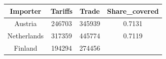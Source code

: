 \documentclass[10pt,]{article}
\begin{document}
\begin{longtable}[]{@{}cccc@{}}
\toprule
\begin{minipage}[b]{0.26\columnwidth}\centering\strut
Importer\strut
\end{minipage} & \begin{minipage}[b]{0.12\columnwidth}\centering\strut
Tariffs\strut
\end{minipage} & \begin{minipage}[b]{0.10\columnwidth}\centering\strut
Trade\strut
\end{minipage} & \begin{minipage}[b]{0.18\columnwidth}\centering\strut
Share\_covered\strut
\end{minipage}\tabularnewline
\midrule
\endhead
\begin{minipage}[t]{0.26\columnwidth}\centering\strut
Austria\strut
\end{minipage} & \begin{minipage}[t]{0.12\columnwidth}\centering\strut
246703\strut
\end{minipage} & \begin{minipage}[t]{0.10\columnwidth}\centering\strut
345939\strut
\end{minipage} & \begin{minipage}[t]{0.18\columnwidth}\centering\strut
0.7131\strut
\end{minipage}\tabularnewline
\begin{minipage}[t]{0.26\columnwidth}\centering\strut
Netherlands\strut
\end{minipage} & \begin{minipage}[t]{0.12\columnwidth}\centering\strut
317359\strut
\end{minipage} & \begin{minipage}[t]{0.10\columnwidth}\centering\strut
445774\strut
\end{minipage} & \begin{minipage}[t]{0.18\columnwidth}\centering\strut
0.7119\strut
\end{minipage}\tabularnewline
\begin{minipage}[t]{0.26\columnwidth}\centering\strut
Finland\strut
\end{minipage} & \begin{minipage}[t]{0.12\columnwidth}\centering\strut
194294\strut
\end{minipage} & \begin{minipage}[t]{0.10\columnwidth}\centering\strut
274456\strut
\end{minipage} & \begin{minipage}[t]{0.18\columnwidth}\centering\strut

\end{minipage}
\end{longtable}
\end{document}

